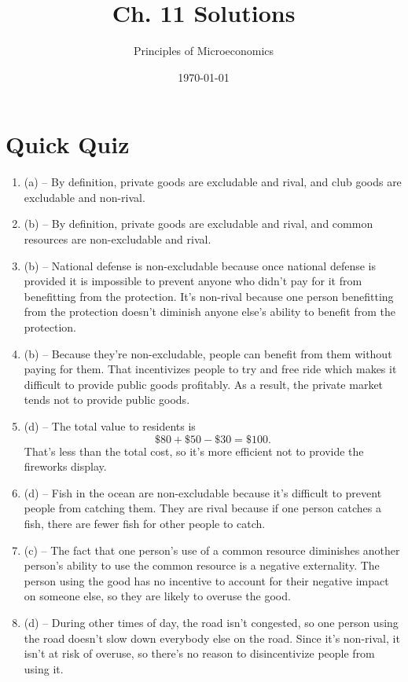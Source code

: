 \documentclass{article}
\title{Ch. 11 Solutions}
\author{Principles of Microeconomics}
\date{\today}
\begin{document}
\maketitle

\section*{Quick Quiz}

\begin{enumerate}

\item (a) -- By definition, private goods are excludable and rival, and club goods are excludable and non-rival. 

\item (b) -- By definition, private goods are excludable and rival, and common resources are non-excludable and rival.

\item (b) -- National defense is non-excludable because once national defense is provided it is impossible to prevent anyone who didn't pay for it from benefitting from the protection. It's non-rival because one person benefitting from the protection doesn't diminish anyone else's ability to benefit from the protection.

\item (b) -- Because they're non-excludable, people can benefit from them without paying for them. That incentivizes people to try and free ride which makes it difficult to provide public goods profitably. As a result, the private market tends not to provide public goods.

\item (d) -- The total value to residents is
	\begin{equation*}
	\$80 + \$50 - \$30 = \$100.
	\end{equation*}
	That's less than the total cost, so it's more efficient not to provide the fireworks display. 
	
\item (d) -- Fish in the ocean are non-excludable because it's difficult to prevent people from catching them. They are rival because if one person catches a fish, there are fewer fish for other people to catch. 

\item (c) -- The fact that one person's use of a common resource diminishes another person's ability to use the common resource is a negative externality. The person using the good has no incentive to account for their negative impact on someone else, so they are likely to overuse the good.

\item (d) -- During other times of day, the road isn't congested, so one person using the road doesn't slow down everybody else on the road. Since it's non-rival, it isn't at risk of overuse, so there's no reason to disincentivize people from using it.

\end{enumerate}
\end{document}
